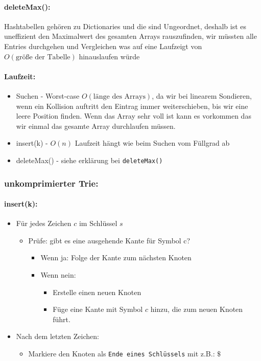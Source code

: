 \documentclass[a4paper,twoside,12pt]{article}
\begin{document}
\begin{description}
\paragraph{deleteMax():} Hashtabellen gehören zu Dictionaries und die sind Ungeordnet, deshalb ist es uneffizient den Maximalwert des gesamten Arrays rauszufinden, wir müssten alle Entries durchgehen und Vergleichen was auf eine Laufzeigt von $O(\text{größe der Tabelle})$ hinauslaufen würde

\paragraph{Laufzeit:}
\begin{itemize}
	\item Suchen - Worst-case $O(\text{länge des Arrays})$, da wir bei linearem Sondieren, wenn ein Kollision auftritt den Eintrag immer weiterschieben, bis wir eine leere Position finden. Wenn das Array sehr voll ist kann es vorkommen das wir einmal das gesamte Array durchlaufen müssen.
	\item insert(k) - $O(n)$ Laufzeit hängt wie beim Suchen vom Füllgrad ab
	\item deleteMax() - siehe erklärung bei \texttt{deleteMax()}
\end{itemize}

\subsubsection*{unkomprimierter Trie:}
\paragraph{insert(k):}
\begin{itemize}
	\item Für jedes Zeichen $c$ im Schlüssel $s$
	\begin{itemize}
		\item Prüfe: gibt es eine ausgehende Kante für Symbol c?
		\begin{itemize}
			\item Wenn ja: Folge der Kante zum nächsten Knoten
			\item Wenn nein:
			\begin{itemize}
				\item Erstelle einen neuen Knoten
				\item Füge eine Kante mit Symbol $c$ hinzu, die zum neuen Knoten führt.
			\end{itemize}
		\end{itemize}
	\end{itemize}
	\item Nach dem letzten Zeichen:
	\begin{itemize}
		\item Markiere den Knoten als \texttt{Ende eines Schlüssels} mit z.B.: $\$$
	\end{itemize}
\end{itemize}


\end{description}
\end{document}
